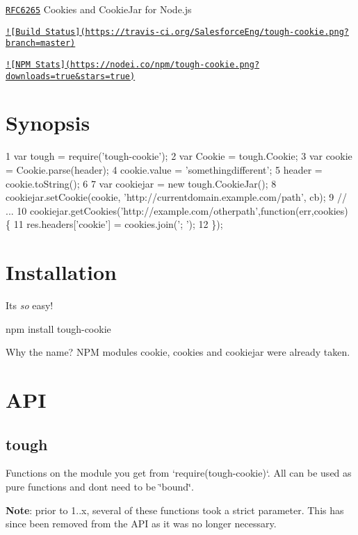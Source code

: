 \href{https://tools.ietf.org/html/rfc6265}{\tt R\+F\+C6265} Cookies and Cookie\+Jar for Node.\+js

\href{https://travis-ci.org/SalesforceEng/tough-cookie}{\tt !\mbox{[}Build Status\mbox{]}(https\+://travis-\/ci.\+org/\+Salesforce\+Eng/tough-\/cookie.\+png?branch=master)}

\href{https://npmjs.org/package/tough-cookie}{\tt !\mbox{[}N\+P\+M Stats\mbox{]}(https\+://nodei.\+co/npm/tough-\/cookie.\+png?downloads=true\&stars=true)} 

\section*{Synopsis}


\begin{DoxyCode}
1 var tough = require('tough-cookie');
2 var Cookie = tough.Cookie;
3 var cookie = Cookie.parse(header);
4 cookie.value = 'somethingdifferent';
5 header = cookie.toString();
6 
7 var cookiejar = new tough.CookieJar();
8 cookiejar.setCookie(cookie, 'http://currentdomain.example.com/path', cb);
9 // ...
10 cookiejar.getCookies('http://example.com/otherpath',function(err,cookies) \{
11   res.headers['cookie'] = cookies.join('; ');
12 \});
\end{DoxyCode}


\section*{Installation}

It\textquotesingle{}s {\itshape so} easy!

{\ttfamily npm install tough-\/cookie}

Why the name? N\+P\+M modules {\ttfamily cookie}, {\ttfamily cookies} and {\ttfamily cookiejar} were already taken.

\section*{A\+P\+I}

\subsection*{tough}

Functions on the module you get from `require(\textquotesingle{}tough-\/cookie\textquotesingle{})`. All can be used as pure functions and don\textquotesingle{}t need to be \char`\"{}bound\char`\"{}.

{\bfseries Note}\+: prior to 1..\+x, several of these functions took a {\ttfamily strict} parameter. This has since been removed from the A\+P\+I as it was no longer necessary.

